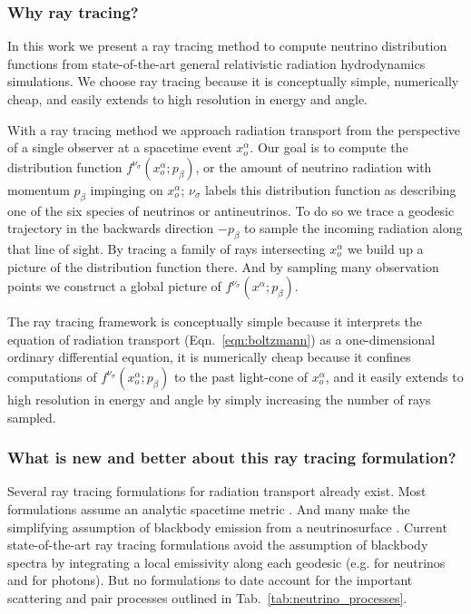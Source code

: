 \documentclass[aps,floatfix,prd,superscriptaddress,twocolumn]{revtex4-1}
\begin{document}
\subsubsection*{Why ray tracing?}
In this work we present a ray tracing method to compute neutrino distribution
functions from state-of-the-art general relativistic radiation
hydrodynamics simulations.
We choose ray tracing because it is conceptually simple, numerically cheap,
and easily extends to high resolution in energy and angle.

With a ray tracing method we approach radiation transport from the perspective
of a single observer at a spacetime event $x_o^\alpha$.
Our goal is to compute the distribution function
$f^{\nu_\sigma}(x_o^\alpha;p_\beta)$, or the amount of neutrino radiation
with momentum $p_\beta$ impinging on $x_o^\alpha$;
$\nu_\sigma$ labels this distribution function as describing one of the
six species of neutrinos or antineutrinos.
To do so we trace a geodesic trajectory in the backwards direction
$-p_\beta$ to sample the incoming radiation along that line of sight.
By tracing a family of rays intersecting $x_o^\alpha$ we build up a
picture of the distribution function there.
And by sampling many observation points we construct a global picture
of $f^{\nu_\sigma}(x^\alpha;p_\beta)$.

The ray tracing framework
is conceptually simple because it interprets the equation of radiation
transport (Eqn.~\ref{eqn:boltzmann})
as a one-dimensional ordinary differential equation,
it is numerically cheap because it confines computations of
$f^{\nu_\sigma}(x_o^\alpha;p_\beta)$ to the past light-cone of $x_o^\alpha$,
and it easily extends to high resolution in energy and angle by simply
increasing the number of rays sampled.

\subsubsection*{What is new and better about this ray tracing formulation?}
Several ray tracing formulations for radiation transport already exist.
Most formulations assume an analytic spacetime metric
\citep{birk2007-nunubar, hari2010-gr_nunubar_collapsar, kova2011-gr_ray_tracing}.
And many make the simplifying assumption of blackbody emission from a
neutrinosurface \citep{birk2007-nunubar, kova2011-gr_ray_tracing}.
Current state-of-the-art ray tracing formulations avoid the assumption of
blackbody spectra by integrating a local emissivity along each geodesic
(e.g. \cite{hari2010-gr_nunubar_collapsar} for neutrinos and
\cite{youn2012-gr_radiative_transfer} for photons).
But no formulations to date account for the important scattering and pair
processes outlined in Tab.~\ref{tab:neutrino_processes}.
\end{document}
